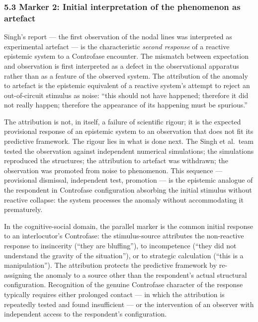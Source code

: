 \documentclass[
  11pt,
  a4paper,
]{article}
\begin{document}
\subsubsection{5.3 Marker 2: Initial interpretation of the phenomenon as
artefact}\label{marker-2-initial-interpretation-of-the-phenomenon-as-artefact}

Singh's report --- the first observation of the nodal lines was
interpreted as experimental artefact --- is the characteristic
\emph{second response} of a reactive epistemic system to a Controfase
encounter. The mismatch between expectation and observation is first
interpreted as a defect in the observational apparatus rather than as a
feature of the observed system. The attribution of the anomaly to
artefact is the epistemic equivalent of a reactive system's attempt to
reject an out-of-circuit stimulus as noise: ``this should not have
happened; therefore it did not really happen; therefore the appearance
of its happening must be spurious.''

The attribution is not, in itself, a failure of scientific rigour; it is
the expected provisional response of an epistemic system to an
observation that does not fit its predictive framework. The rigour lies
in what is done next. The Singh et al.~team tested the observation
against independent numerical simulations; the simulations reproduced
the structures; the attribution to artefact was withdrawn; the
observation was promoted from noise to phenomenon. This sequence ---
provisional dismissal, independent test, promotion --- is the epistemic
analogue of the respondent in Controfase configuration absorbing the
initial stimulus without reactive collapse: the system processes the
anomaly without accommodating it prematurely.

In the cognitive-social domain, the parallel marker is the common
initial response to an interlocutor's Controfase: the stimulus-source
attributes the non-reactive response to insincerity (``they are
bluffing''), to incompetence (``they did not understand the gravity of
the situation''), or to strategic calculation (``this is a
manipulation''). The attribution protects the predictive framework by
re-assigning the anomaly to a source other than the respondent's actual
structural configuration. Recognition of the genuine Controfase
character of the response typically requires either prolonged contact
--- in which the attribution is repeatedly tested and found insufficient
--- or the intervention of an observer with independent access to the
respondent's configuration.
\end{document}
